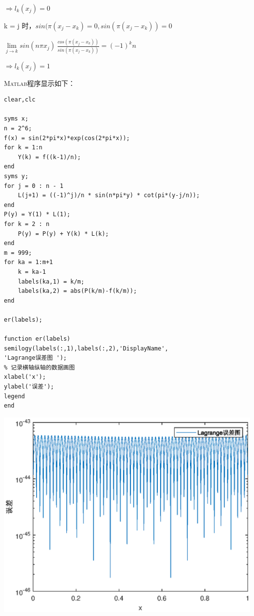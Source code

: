 \documentclass[12pt,a4paper,UTF8]{ctexart}
\begin{document}
\begin{enumerate}
\quad $\Rightarrow l_k(x_j) = 0$

k = j 时，$sin(\pi(x_j - x_k) = 0, sin(\pi(x_j - x_k)) = 0$

\qquad $\lim\limits_{j \to k} sin(n\pi x_j)~\frac{cos(\pi(x_j - x_k))}{sin(\pi(x_j - x_k))} = (-1)^k n$

\quad $\Rightarrow l_k(x_j) = 1$

\textsc{Matlab}程序显示如下：
\begin{lstlisting}[frame=single]
clear,clc

syms x;
n = 2^6;
f(x) = sin(2*pi*x)*exp(cos(2*pi*x));
for k = 1:n
    Y(k) = f((k-1)/n);
end
syms y;
for j = 0 : n - 1 
    L(j+1) = ((-1)^j)/n * sin(n*pi*y) * cot(pi*(y-j/n));
end
P(y) = Y(1) * L(1);
for k = 2 : n
    P(y) = P(y) + Y(k) * L(k);
end
m = 999;
for ka = 1:m+1
    k = ka-1
    labels(ka,1) = k/m;
    labels(ka,2) = abs(P(k/m)-f(k/m));
end

er(labels);

function er(labels)
semilogy(labels(:,1),labels(:,2),'DisplayName',
'Lagrange误差图 ');
% 记录横轴纵轴的数据画图
xlabel('x');
ylabel('误差');
legend
end
\end{lstlisting}
\begin{center}
\includegraphics[scale=1]{3b.eps}\\
\end{center}
    

\end{enumerate}
\end{document}
